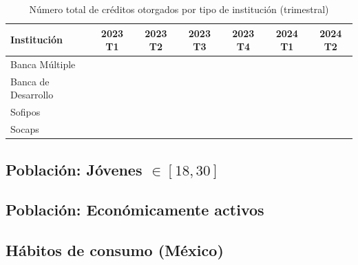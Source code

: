 \begin{table}[h!]
    \centering
    \caption{Número total de créditos otorgados por tipo de institución (trimestral)}
    \begin{tabular}{lcccccc}
        \hline
        \textbf{Institución} & \textbf{2023 T1} & \textbf{2023 T2} & \textbf{2023 T3} & \textbf{2023 T4} & \textbf{2024 T1} & \textbf{2024 T2} \\
        \hline
        Banca Múltiple       &                 &                 &                 &                 &                 &                 \\
        Banca de Desarrollo  &                 &                 &                 &                 &                 &                 \\
        Sofipos              &                 &                 &                 &                 &                 &                 \\
        Socaps               &                 &                 &                 &                 &                 &                 \\
        \hline
    \end{tabular}
    \label{tab:total_creditos_trimestrales}
\end{table}



\subsection*{Población: Jóvenes $\in[18,30]$}

\subsection*{Población: Económicamente activos}

\subsection*{Hábitos de consumo (México)}